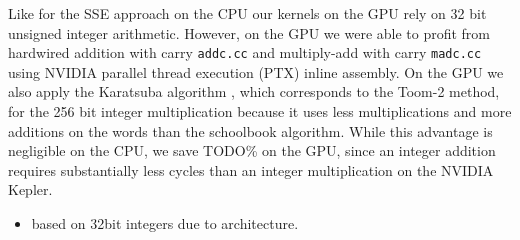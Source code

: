 \documentclass[oribibl,a4paper]{llncs2e/llncs}
\begin{document}
Like for the SSE approach on the CPU our kernels on the GPU rely on 32 bit unsigned integer arithmetic.
However, on the GPU we were able to profit from hardwired addition with carry \verb|addc.cc| and multiply-add with carry \verb|madc.cc| using NVIDIA parallel thread execution (PTX) inline assembly.
On the GPU we also apply the Karatsuba algorithm \cite{Karatsuba1963}, which corresponds to the Toom-2 method, for the 256 bit integer multiplication because it uses less multiplications and more additions on the words than the schoolbook algorithm.
While this advantage is negligible on the CPU, we save TODO\% on the GPU, since an integer addition requires substantially less cycles than an integer multiplication on the NVIDIA Kepler.
\begin{itemize}
\item based on 32bit integers due to architecture.

\end{itemize}
\end{document}
